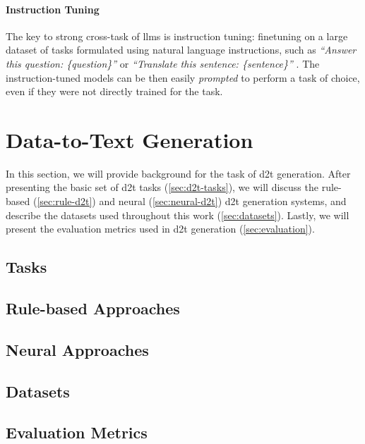 \paragraph{Instruction Tuning} The key to strong cross-task of \acp{llm} is instruction tuning: finetuning on a large dataset of tasks formulated using natural language instructions, such as \textit{``Answer this question: \{question\}''} or \textit{``Translate this sentence: \{sentence\}''} \cite{sanh2021multitask,ouyang2022training}. The instruction-tuned models can be then easily \emph{prompted} to perform a task of choice, even if they were not directly trained for the task.



\section{Data-to-Text Generation}
\label{sec:d2t}
In this section, we will provide background for the task of \ac{d2t} generation. After presenting the basic set of \ac{d2t} tasks (\autoref{sec:d2t-tasks}), we will discuss the rule-based (\autoref{sec:rule-d2t}) and neural (\autoref{sec:neural-d2t}) \ac{d2t} generation systems, and describe the datasets used throughout this work (\autoref{sec:datasets}). Lastly, we will present the evaluation metrics used in \ac{d2t} generation (\autoref{sec:evaluation}).

\subsection{Tasks}
\label{sec:d2t-tasks}

\subsection{Rule-based Approaches}
\label{sec:rule-d2t}
\subsection{Neural Approaches}
\label{sec:neural-d2t}
\subsection{Datasets}
\label{sec:datasets}
\subsection{Evaluation Metrics}
\label{sec:evaluation}